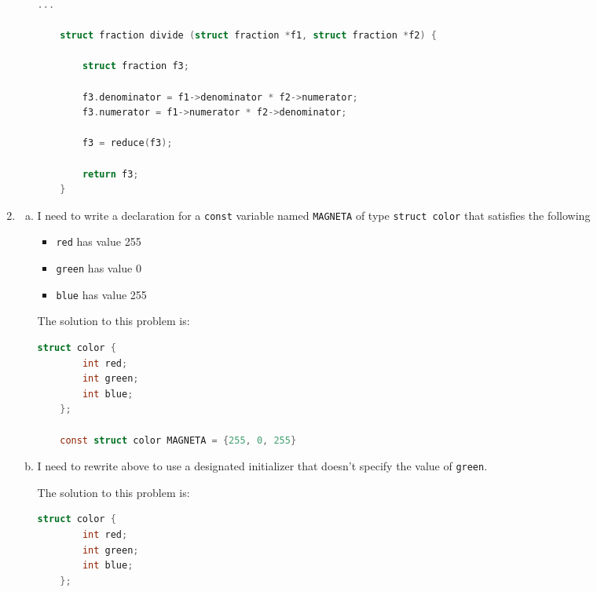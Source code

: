 \documentclass[12pt]{article}
\begin{document}
\begin{enumerate}[1.]
\begin{enumerate}[a)]
\begin{lstlisting}[language=c]
    ...

    struct fraction divide (struct fraction *f1, struct fraction *f2) {

        struct fraction f3;

        f3.denominator = f1->denominator * f2->numerator;
        f3.numerator = f1->numerator * f2->denominator;

        f3 = reduce(f3);

        return f3;
    }


\end{lstlisting}

    \end{enumerate}

    \item

    \begin{enumerate}[a)]
        \item

        I need to write a declaration for a \texttt{const} variable named \texttt{MAGNETA}
        of type \texttt{struct color} that satisfies the following

        \begin{itemize}
            \item \texttt{red} has value 255
            \item \texttt{green} has value 0
            \item \texttt{blue} has value 255
        \end{itemize}

        \bigskip

        The solution to this problem is:

\begin{lstlisting}[language=c]
    struct color {
        int red;
        int green;
        int blue;
    };

    const struct color MAGNETA = {255, 0, 255}
\end{lstlisting}
        \item

        I need to rewrite above to use a designated initializer that doesn't specify the value
        of \texttt{green}.

        \bigskip

        The solution to this problem is:

\begin{lstlisting}[language=c]
    struct color {
        int red;
        int green;
        int blue;
    };


\end{lstlisting}
\end{enumerate}
\end{enumerate}
\end{document}
